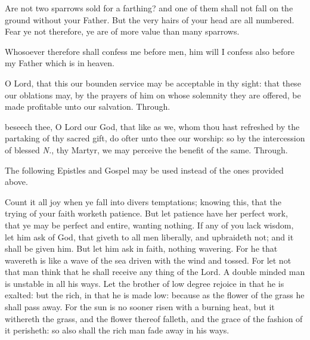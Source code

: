Are not two sparrows sold for a farthing? and one of them shall not fall on the ground without your Father. But the very hairs of your head are all numbered. Fear ye not therefore, ye are of more value than many sparrows.

Whosoever therefore shall confess me before men, him will I confess also before my Father which is in heaven.


\secret
{} O Lord, that this our bounden service may be acceptable in thy sight: that these our oblations may, by the prayers of him on whose solemnity they are offered, be made profitable unto our salvation. Through.


\postcommunion
{} beseech thee, O Lord our God, that like as we, whom thou hast refreshed by the partaking of thy sacred gift, do ofter unto thee our worship: so by the intercession of blessed \textit{N.}, thy Martyr, we may perceive the benefit of the same. Through.

\clearpage
\begin{rubric}
	The following Epistles and Gospel may be used instead of the ones provided above.
\end{rubric}

\label{James12}
 Count it all joy when ye fall into divers temptations; knowing this, that the trying of your faith worketh patience. But let patience have her perfect work, that ye may be perfect and entire, wanting nothing. If any of you lack wisdom, let him ask of God, that giveth to all men liberally, and upbraideth not; and it shall be given him. But let him ask in faith, nothing wavering. For he that wavereth is like a wave of the sea driven with the wind and tossed. For let not that man think that he shall receive any thing of the Lord. A double minded man is unstable in all his ways. Let the brother of low degree rejoice in that he is exalted: but the rich, in that he is made low: because as the flower of the grass he shall pass away. For the sun is no sooner risen with a burning heat, but it withereth the grass, and the flower thereof falleth, and the grace of the fashion of it perisheth: so also shall the rich man fade away in his ways.

